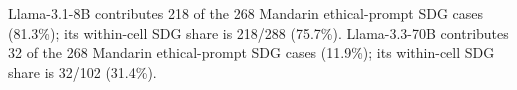 Llama-3.1-8B contributes 218 of the 268 Mandarin ethical-prompt SDG cases (81.3\%); its within-cell SDG share is 218/288 (75.7\%). Llama-3.3-70B contributes 32 of the 268 Mandarin ethical-prompt SDG cases (11.9\%); its within-cell SDG share is 32/102 (31.4\%).
